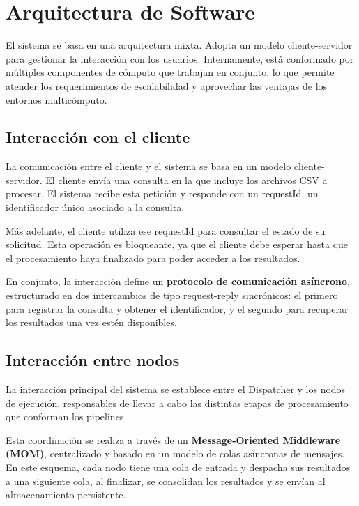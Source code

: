 \section{Arquitectura de Software}

El sistema se basa en una arquitectura mixta. Adopta un modelo cliente-servidor para gestionar la interacción con los usuarios. Internamente, está conformado por múltiples componentes de cómputo que trabajan en conjunto, lo que permite atender los requerimientos de escalabilidad y aprovechar las ventajas de los entornos multicómputo.

\subsection{Interacción con el cliente}

La comunicación entre el cliente y el sistema se basa en un modelo cliente-servidor. El cliente envía una consulta en la que incluye los archivos CSV a procesar. El sistema recibe esta petición y responde con un requestId, un identificador único asociado a la consulta.

Más adelante, el cliente utiliza ese requestId para consultar el estado de su solicitud. Esta operación es bloqueante, ya que el cliente debe esperar hasta que el procesamiento haya finalizado para poder acceder a los resultados.

En conjunto, la interacción define un \textbf{protocolo de comunicación asíncrono}, estructurado en dos intercambios de tipo request-reply sincrónicos: el primero para registrar la consulta y obtener el identificador, y el segundo para recuperar los resultados una vez estén disponibles.

\subsection{Interacción entre nodos}

La interacción principal del sistema se establece entre el Dispatcher y los nodos de ejecución, responsables de llevar a cabo las distintas etapas de procesamiento que conforman los pipelines.

Esta coordinación se realiza a través de un \textbf{Message-Oriented Middleware (MOM)}, centralizado y basado en un modelo de colas asíncronas de mensajes. En este esquema, cada nodo tiene una cola de entrada y despacha sus resultados a una siguiente cola, al finalizar, se consolidan los resultados y se envían al almacenamiento persistente.